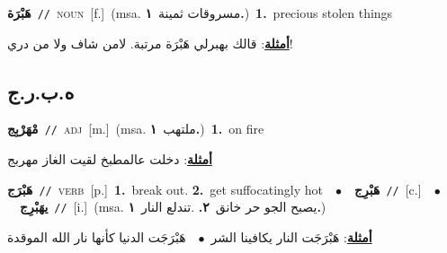 \documentclass[10pt,a4paper,twoside]{article} %
\begin{document}
\begin{multicols}{2}
{\setlength\topsep{0pt}\textbf{\foreignlanguage{arabic}{هَبْرَة}}\ {\color{gray}\texttt{//}\color{black}}\ \textsc{noun}\ [f.]\ \color{gray}(msa. \foreignlanguage{arabic}{مسروقات ثمينة}~\foreignlanguage{arabic}{\textbf{١.}})\color{black}\ \textbf{1.}~precious stolen things\  \begin{flushright}\color{gray}\foreignlanguage{arabic}{\textbf{\underline{\foreignlanguage{arabic}{أمثلة}}}: قالك بهبرلي هَبْرَة  مرتبة. لامن شاف ولا من دري!}\end{flushright}\color{black}} \vspace{2mm}

\vspace{-3mm}
\subsection*{\color{blue}\foreignlanguage{arabic}{ه.ب.ر.ج}\color{blue}{}} 

{\setlength\topsep{0pt}\textbf{\foreignlanguage{arabic}{مْهَرْبِج}}\ {\color{gray}\texttt{//}\color{black}}\ \textsc{adj}\ [m.]\ \color{gray}(msa. \foreignlanguage{arabic}{ملتهب}~\foreignlanguage{arabic}{\textbf{١.}})\color{black}\ \textbf{1.}~on fire\  \begin{flushright}\color{gray}\foreignlanguage{arabic}{\textbf{\underline{\foreignlanguage{arabic}{أمثلة}}}: دخلت عالمطبخ لقيت الغاز مهربج}\end{flushright}\color{black}} \vspace{2mm}

{\setlength\topsep{0pt}\textbf{\foreignlanguage{arabic}{هَبْرَج}}\ {\color{gray}\texttt{//}\color{black}}\ \textsc{verb}\ [p.]\ \textbf{1.}~break out.  \textbf{2.}~get suffocatingly hot\ \ $\bullet$\ \ \setlength\topsep{0pt}\textbf{\foreignlanguage{arabic}{هَبْرِج}}\ {\color{gray}\texttt{//}\color{black}}\ [c.]\ \ $\bullet$\ \ \setlength\topsep{0pt}\textbf{\foreignlanguage{arabic}{يهَبْرِج}}\ {\color{gray}\texttt{//}\color{black}}\ [i.]\ \color{gray}(msa. \foreignlanguage{arabic}{يصبح الجو حر خانق}~\foreignlanguage{arabic}{\textbf{٢.}}  .\foreignlanguage{arabic}{تندلع النار}~\foreignlanguage{arabic}{\textbf{١.}})\color{black}\  \begin{flushright}\color{gray}\foreignlanguage{arabic}{\textbf{\underline{\foreignlanguage{arabic}{أمثلة}}}: هَبْرَجَت النار يكافينا الشر\ $\bullet$\ \  هَبْرَجَت الدنيا كأنها نار الله الموقدة}\end{flushright}\color{black}} \vspace{2mm}


\end{multicols}
\end{document}
